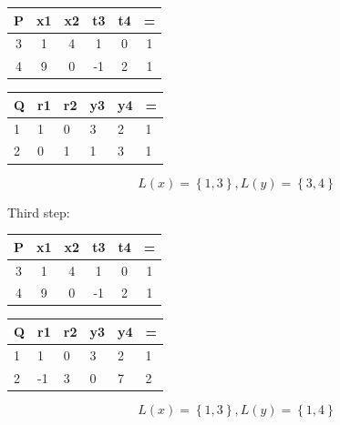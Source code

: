 \documentclass{article}
\newenvironment{answer}{\par\color{ForestGreen}}{\par}
\begin{document}
\begin{answer}
\begin{table}[!htb]
\begin{answer}
\begin{minipage}[t]{.5\textwidth}
\centering
\begin{tabular}[t]{cccccc}
  \toprule
  P & x1 & x2 & t3 & t4 & = \\
  \midrule
  3 & 1 & 4 & 1 & 0 & 1 \\
  \hline
  4 & 9 & 0 & -1 & 2 & 1 \\
  \bottomrule
\end{tabular}
\end{minipage}
\begin{minipage}[t]{0.5\textwidth}
\centering
\begin{tabular}[t]{llllll}
  \toprule
  Q & r1 & r2 & y3 & y4 & = \\
  \midrule
  1 & 1 & 0 & 3 & 2 & 1 \\
  \hline
  2 & 0 & 1 & 1 & 3 & 1 \\
  \bottomrule
\end{tabular}
\end{minipage}
\end{answer}
\end{table}
$$L(x)=\left\{1,3\right\}, L(y)=\left\{3,4\right\}$$

Third step:

\begin{table}[!htb]
\begin{answer}
\begin{minipage}[t]{.5\textwidth}
\centering
\begin{tabular}[t]{cccccc}
  \toprule
  P & x1 & x2 & t3 & t4 & = \\
  \midrule
  3 & 1 & 4 & 1 & 0 & 1 \\
  \hline
  4 & 9 & 0 & -1 & 2 & 1 \\
  \bottomrule
\end{tabular}
\end{minipage}
\begin{minipage}[t]{0.5\textwidth}
\centering
\begin{tabular}[t]{llllll}
  \toprule
  Q & r1 & r2 & y3 & y4 & = \\
  \midrule
  1 & 1 & 0 & 3 & 2 & 1 \\
  \hline
  2 & -1 & 3 & 0 & 7 & 2 \\
  \bottomrule
\end{tabular}
\end{minipage}
\end{answer}
\end{table}
$$L(x)=\left\{1,3\right\}, L(y)=\left\{1,4\right\}$$


\end{answer}
\end{document}
